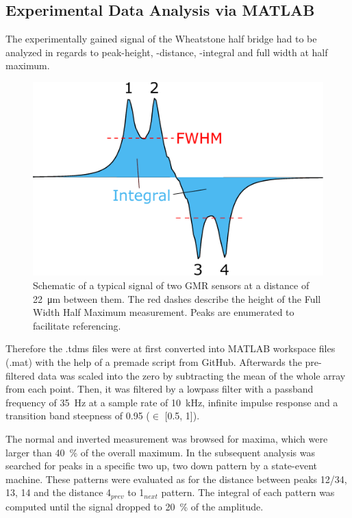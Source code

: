 \subsection{Experimental Data Analysis via MATLAB}
The experimentally gained signal of the Wheatstone half bridge had to be analyzed in regards to peak-height, -distance, -integral and full width at half maximum.
\begin{figure}
	\centering
	\includegraphics[width=\linewidth,trim={0 0 0 8mm}]{Ressourcen/IMG/ParticleSignalEval}
	\caption{Schematic of a typical signal of two GMR sensors at a distance of \SI{22}{\micro\meter} between them. The red dashes describe the height of the Full Width Half Maximum measurement. Peaks are enumerated to facilitate referencing.}
	\label{fig:sim:peaks}
\end{figure}
Therefore the .tdms files were at first converted into MATLAB workspace files (.mat) with the help of a premade script from GitHub.\cite{lit:exp:tdms2mat} Afterwards the pre-filtered data was scaled into the zero by subtracting the mean of the whole array from each point. Then, it was filtered by a lowpass filter with a passband frequency of \SI{35}{\Hz} at a sample rate of \SI{10}{\kHz}, infinite impulse response and a transition band steepness of 0.95 ($\in$ [0.5, 1]).

The normal and inverted measurement was browsed for maxima, which were larger than \SI{40}{\percent} of the overall maximum. In the subsequent analysis was searched for peaks in a specific two up, two down pattern by a state-event machine. These patterns were evaluated as for the distance between peaks 12/34, 13, 14 and the distance 4$_{prev}$ to 1$_{next}$ pattern.
The integral of each pattern was computed until the signal dropped to \SI{20}{\percent} of the amplitude. 
\clearpage
\newpage\null\thispagestyle{empty}\newpage
